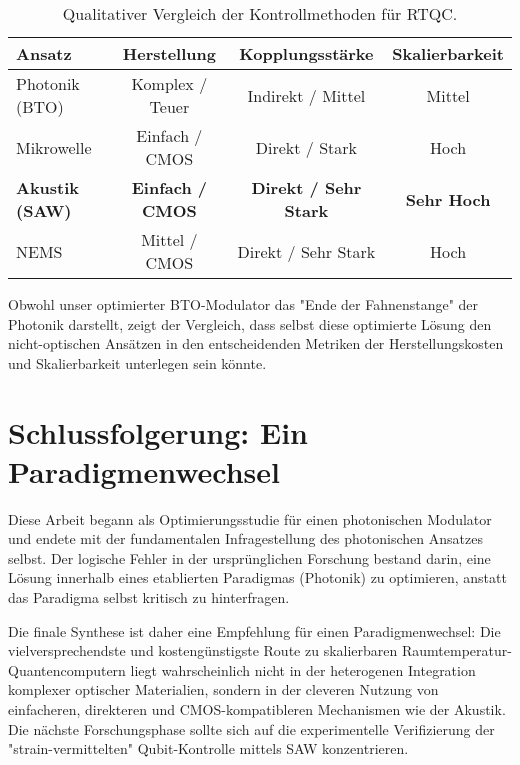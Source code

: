 \documentclass[12pt, a4paper, numbers]{report}
\begin{document}
\begin{table}[htbp]
\caption{Qualitativer Vergleich der Kontrollmethoden für RTQC.}
\label{tab:final_comp}
\centering
\begin{tabular}{lccc}
\toprule
\textbf{Ansatz} & \textbf{Herstellung} & \textbf{Kopplungsstärke} & \textbf{Skalierbarkeit} \\
\midrule
Photonik (BTO) & Komplex / Teuer & Indirekt / Mittel & Mittel \\
Mikrowelle & Einfach / CMOS & Direkt / Stark & Hoch \\
\textbf{Akustik (SAW)} & \textbf{Einfach / CMOS} & \textbf{Direkt / Sehr Stark} & \textbf{Sehr Hoch} \\
NEMS & Mittel / CMOS & Direkt / Sehr Stark & Hoch \\
\bottomrule
\end{tabular}
\end{table}

Obwohl unser optimierter BTO-Modulator das "Ende der Fahnenstange" der Photonik darstellt, zeigt der Vergleich, dass selbst diese optimierte Lösung den nicht-optischen Ansätzen in den entscheidenden Metriken der Herstellungskosten und Skalierbarkeit unterlegen sein könnte.

\section{Schlussfolgerung: Ein Paradigmenwechsel}
Diese Arbeit begann als Optimierungsstudie für einen photonischen Modulator und endete mit der fundamentalen Infragestellung des photonischen Ansatzes selbst. Der logische Fehler in der ursprünglichen Forschung bestand darin, eine Lösung innerhalb eines etablierten Paradigmas (Photonik) zu optimieren, anstatt das Paradigma selbst kritisch zu hinterfragen.

Die finale Synthese ist daher eine Empfehlung für einen Paradigmenwechsel: Die vielversprechendste und kostengünstigste Route zu skalierbaren Raumtemperatur-Quantencomputern liegt wahrscheinlich nicht in der heterogenen Integration komplexer optischer Materialien, sondern in der cleveren Nutzung von einfacheren, direkteren und CMOS-kompatibleren Mechanismen wie der Akustik. Die nächste Forschungsphase sollte sich auf die experimentelle Verifizierung der "strain-vermittelten" Qubit-Kontrolle mittels SAW konzentrieren.
\end{document}
